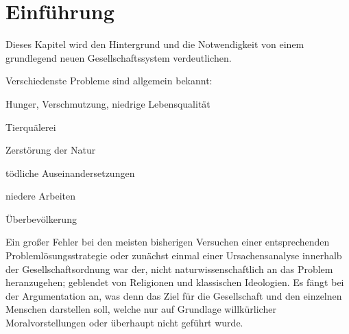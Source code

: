 \chapter{Einführung}\label{chap:introduction}

Dieses Kapitel wird den Hintergrund und die Notwendigkeit von einem grundlegend neuen Gesellschaftssystem verdeutlichen.

Verschiedenste Probleme sind allgemein bekannt:
\medskip
\begin{compactitem}
\item Hunger, Verschmutzung, niedrige Lebensqualität
\item Tierquälerei
\item Zerstörung der Natur
\item tödliche Auseinandersetzungen
\item niedere Arbeiten
\item Überbevölkerung
\end{compactitem}
\medskip

Ein großer Fehler bei den meisten bisherigen Versuchen einer entsprechenden Problemlösungsstrategie oder zunächst einmal einer Ursachensanalyse innerhalb der Gesellschaftsordnung war der, nicht naturwissenschaftlich an das Problem heranzugehen; geblendet von Religionen und klassischen Ideologien. Es fängt bei der Argumentation an, was denn das Ziel für die Gesellschaft und den einzelnen Menschen darstellen soll, welche nur auf Grundlage willkürlicher Moralvorstellungen oder überhaupt nicht geführt wurde.
